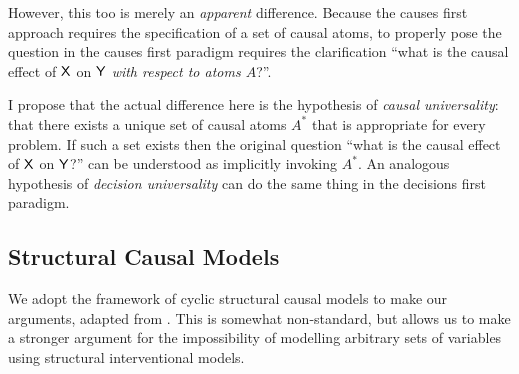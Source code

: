 However, this too is merely an \emph{apparent} difference. Because the causes first approach requires the specification of a set of causal atoms, to properly pose the question in the causes first paradigm requires the clarification ``what is the causal effect of $\mathsf{X}$ on $\mathsf{Y}$ \emph{with respect to atoms $A$}?''.

I propose that the actual difference here is the hypothesis of \emph{causal universality}: that there exists a unique set of causal atoms $A^*$ that is appropriate for every problem. If such a set exists then the original question ``what is the causal effect of $\mathsf{X}$ on $\mathsf{Y}$?'' can be understood as implicitly invoking $A^*$. An analogous hypothesis of \emph{decision universality} can do the same thing in the decisions first paradigm.




\subsection{Structural Causal Models}

We adopt the framework of cyclic structural causal models to make our arguments, adapted from \citet{bongers_theoretical_2016}. This is somewhat non-standard, but allows us to make a stronger argument for the impossibility of modelling arbitrary sets of variables using structural interventional models.

